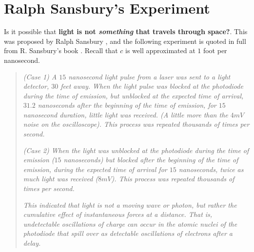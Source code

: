 \documentclass[12pt]{article}
\begin{document}




\section{Ralph Sansbury's Experiment}\label{sansbury}

Is it possible that \textbf{light is not \emph{something} that travels through space?}. This was proposed by Ralph Sansbury \cite{sansburylight}, and the following experiment is quoted in full from R. Sansbury's book \cite{sansburyspeed}. Recall that $c$ is well approximated at $1$ foot per nanosecond.

\begin{quote}
\emph{ (Case 1) A $15$ nanosecond light pulse from a laser was sent to a light detector, $30$ feet away. When the light pulse was blocked at the photodiode during the time of emission, but unblocked at the expected time of arrival, $31.2$ nanoseconds after the beginning of the time of emission, for $15$ nanosecond duration, little light was received. (A little more than the $4mV$ noise on the oscilloscope). This process was repeated thousands of times per second.}

\emph{(Case 2) When the light was unblocked at the photodiode during the time of emission ($15$ nanoseconds) but blocked after the beginning of the time of emission, during the expected time of arrival for $15$ nanoseconds, twice as much light was received ($8mV$). This process was repeated thousands of times per second.}

\emph{This indicated that light is not a moving wave or photon, but rather the cumulative effect of instantaneous forces at a distance. That is, undetectable oscillations of charge can occur in the atomic nuclei of the photodiode that spill over as detectable oscillations of electrons after a delay.}
\end{quote}
\end{document}
